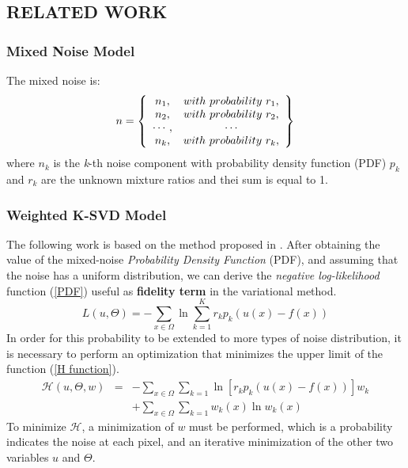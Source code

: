 \subsection{RELATED WORK}
\subsubsection{Mixed Noise Model}
The mixed noise is:
\begin{equation}
    n = \left\{ \\
    \begin{array}{cc}
        n_1, & with~probability~r_1,\\
        n_2, & with~probability~r_2,\\
        \cdots, & \cdots\\
        n_k, & with~probability~r_k,\\ 
    \end{array}
     \right\}
\end{equation}
where $ n_k $ is the \emph{k}-th noise component with probability density function (PDF) 
$ p_k $ and $ r_k $ are the unknown mixture ratios and thei sum is equal to 1.

\subsubsection{Weighted K-SVD Model}
The following work is based on the method proposed in \cite{0884882814}. After obtaining 
the value of the mixed-noise \emph{Probability Density Function} (PDF), and 
assuming that the noise has a uniform distribution, we can derive the \emph{negative 
log-likelihood} function (\ref{PDF}) useful as {\bfseries{fidelity term}} in the variational 
method. 
\begin{equation}\label{PDF}
    L(u,\Theta) = - \sum_{x\in\Omega}\ln\sum_{k=1}^Kr_kp_k(u(x)-f(x))
\end{equation}
In order for this probability to be extended to more types of noise 
distribution, it is necessary to perform an optimization that minimizes the 
upper limit of the function (\ref{H function}). 
\begin{eqnarray}\label{H function}
    \mathcal{H}(u,\Theta,w) & = & - \sum_{x\in\Omega}\sum_{k=1}\ln\left[r_kp_k(u(x)-f(x))\right]w_k \nonumber \\
                  &   & + \sum_{x\in\Omega}\sum_{k=1}w_k(x)\ln{w_k(x)}  
\end{eqnarray}
To minimize $\mathcal{H}$, a minimization of $ w $ must be performed, which is a probability 
indicates the noise at each pixel, and an iterative minimization of the other 
two variables $ u $ and $ \Theta $.

